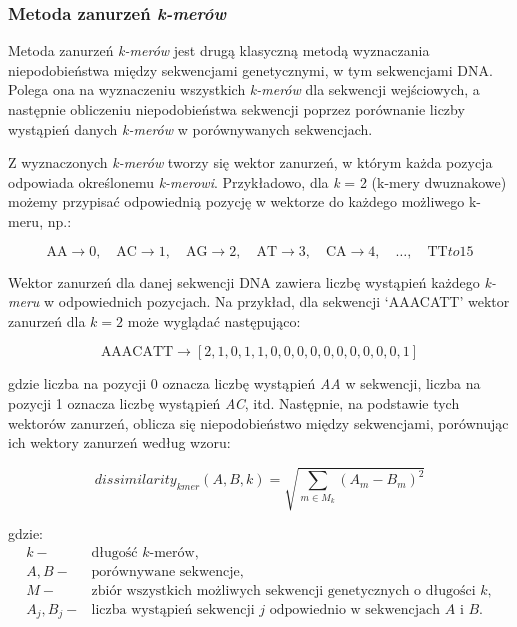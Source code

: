         \subsubsection{Metoda zanurzeń \textit{k-merów}}
            Metoda zanurzeń \textit{k-merów} jest drugą klasyczną metodą wyznaczania niepodobieństwa między sekwencjami genetycznymi, w tym sekwencjami DNA. Polega ona na wyznaczeniu wszystkich \textit{k-merów} dla sekwencji wejściowych, a następnie obliczeniu niepodobieństwa sekwencji poprzez porównanie liczby wystąpień danych \textit{k-merów} w porównywanych sekwencjach.

            Z wyznaczonych \textit{k-merów} tworzy się wektor zanurzeń, w którym każda pozycja odpowiada określonemu \textit{k-merowi}. Przykładowo, dla \textit{k} = 2 (k-mery dwuznakowe) możemy przypisać odpowiednią pozycję w wektorze do każdego możliwego k-meru, np.:
            
            \[
                \text{AA} \to 0, \quad \text{AC} \to 1, \quad \text{AG} \to 2, \quad \text{AT} \to 3, \quad \text{CA} \to 4, \quad \dots, \quad \text{TT} to 15
            \]
            
            Wektor zanurzeń dla danej sekwencji DNA zawiera liczbę wystąpień każdego \textit{k-meru} w odpowiednich pozycjach. Na przykład, dla sekwencji `AAACATT' wektor zanurzeń dla $k=2$ może wyglądać następująco:
            
            \[
                \text{AAACATT} \to [2, 1, 0, 1, 1, 0, 0, 0, 0, 0, 0, 0, 0, 0, 0, 1]
            \]
            
            gdzie liczba na pozycji 0 oznacza liczbę wystąpień \textit{AA} w sekwencji, liczba na pozycji 1 oznacza liczbę wystąpień \textit{AC}, itd. Następnie, na podstawie tych wektorów zanurzeń, oblicza się niepodobieństwo między sekwencjami, porównując ich wektory zanurzeń według wzoru:

            \begin{equation}
                dissimilarity_{kmer}(A, B, k) = \sqrt{\sum_{m \in M_{k}} (A_m - B_m)^{2}}
            \end{equation}

            gdzie:
            \begin{align*} 
                k -& \text{długość $k$-merów}, \\
                A, B -& \text{porównywane sekwencje}, \\
                M -& \text{zbiór wszystkich możliwych sekwencji genetycznych o długości $k$}, \\
                A_j, B_j -& \text{liczba wystąpień sekwencji } j \text{ odpowiednio w sekwencjach } A \text{ i } B. \\
            \end{align*}

